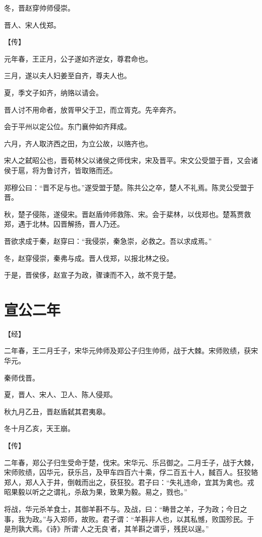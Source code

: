 \documentclass[a4paper,12pt,UTF8,twoside]{ctexbook}
\begin{document}
冬，晋赵穿帅师侵崇。

晋人、宋人伐郑。

【传】

元年春，王正月，公子遂如齐逆女，尊君命也。

三月，遂以夫人妇姜至自齐，尊夫人也。

夏，季文子如齐，纳赂以请会。

晋人讨不用命者，放胥甲父于卫，而立胥克。先辛奔齐。

会于平州以定公位。东门襄仲如齐拜成。

六月，齐人取济西之田，为立公故，以赂齐也。

宋人之弑昭公也，晋荀林父以诸侯之师伐宋，宋及晋平。宋文公受盟于晋，又会诸侯于扈，将为鲁讨齐，皆取赂而还。

郑穆公曰：“晋不足与也。”遂受盟于楚。陈共公之卒，楚人不礼焉。陈灵公受盟于晋。

秋，楚子侵陈，遂侵宋。晋赵盾帅师救陈、宋。会于棐林，以伐郑也。楚蒍贾救郑，遇于北林。囚晋解扬，晋人乃还。

晋欲求成于秦，赵穿曰：“我侵崇，秦急崇，必救之。吾以求成焉。”

冬，赵穿侵崇，秦弗与成。晋人伐郑，以报北林之役。

于是，晋侯侈，赵宣子为政，骤谏而不入，故不竞于楚。


\chapter{宣公二年}




【经】

二年春，王二月壬子，宋华元帅师及郑公子归生帅师，战于大棘。宋师败绩，获宋华元。

秦师伐晋。

夏，晋人、宋人、卫人、陈人侵郑。

秋九月乙丑，晋赵盾弑其君夷皋。

冬十月乙亥，天王崩。

【传】

二年春，郑公子归生受命于楚，伐宋。宋华元、乐吕御之。二月壬子，战于大棘，宋师败绩，囚华元，获乐吕，及甲车四百六十乘，俘二百五十人，馘百人。狂狡辂郑人，郑人入于井，倒戟而出之，获狂狡。君子曰：“失礼违命，宜其为禽也。戎昭果毅以听之之谓礼，杀敌为果，致果为毅。易之，戮也。”

将战，华元杀羊食士，其御羊斟不与。及战，曰：“畴昔之羊，子为政；今日之事，我为政。”与入郑师，故败。君子谓：“羊斟非人也，以其私憾，败国殄民。于是刑孰大焉。《诗》所谓‘人之无良’者，其羊斟之谓乎，残民以逞。”
\end{document}
